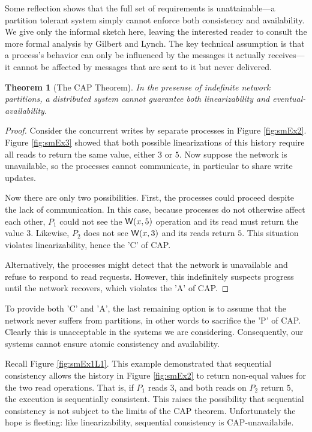 \documentclass[]             %
{NASA}                       %
\newtheorem{theorem}{Theorem}[section]
\theoremstyle{definition}
\begin{document}
Some reflection shows that the full set of requirements is
unattainable---a partition tolerant system simply cannot enforce both
consistency and availability. We give only the informal sketch here,
leaving the interested reader to consult the more formal analysis by
Gilbert and Lynch. The key technical assumption is that a process's
behavior can only be influenced by the messages it actually
receives---it cannot be affected by messages that are sent to it but
never delivered.

\begin{theorem}[The CAP Theorem]
  \label{thm:cap}
  In the presense of indefinite network partitions, a distributed system
  cannot guarantee both linearizability and eventual-availability.
\end{theorem}
\begin{proof}
  Consider the concurrent writes by separate processes in Figure
  \ref{fig:smEx2}.  Figure \ref{fig:smEx3} showed that both possible
  linearizations of this history require all reads to return the same
  value, either $3$ or $5$. Now suppose the network is unavailable, so
  the processes cannot communicate, in particular to share write
  updates.

  Now there are only two possibilities. First, the processes could
  proceed despite the lack of communication. In this case, because
  processes do not otherwise affect each other, $P_1$ could not see
  the $\mathsf{W}\!\left(x, 5\right)$ operation and its read must return the value
  $3$. Likewise, $P_2$ does not see $\mathsf{W}\!\left(x, 3\right)$ and its reads return
  $5$. This situation violates linearizability, hence the 'C' of CAP.

  Alternatively, the processes might detect that the network is
  unavailable and refuse to respond to read requests. However, this
  indefinitely suspects progress until the network recovers, which
  violates the 'A' of CAP.
\end{proof}

To provide both 'C' and 'A', the last remaining option is to assume
that the network never suffers from partitions, in other words to
sacrifice the 'P' of CAP. Clearly this is unacceptable in the systems
we are considering. Consequently, our systems cannot ensure atomic
consistency and availability.

Recall Figure \ref{fig:smEx1L1}. This example demonstrated that
sequential consistency allows the history in Figure \ref{fig:smEx2} to
return non-equal values for the two read operations. That is, if $P_1$
reads $3$, and both reads on $P_2$ return $5$, the execution is
sequentially consistent. This raises the possibility that sequential
consistency is not subject to the limits of the CAP
theorem. Unfortunately the hope is fleeting: like linearizability,
sequential consistency is CAP-unavailabile.
\end{document}
